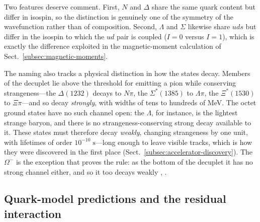 Two features deserve comment. First, $N$ and $\Delta$ share the same quark content but
differ in isospin, so the distinction is genuinely one of the symmetry of the
wavefunction rather than of composition. Second, $\Lambda$ and $\Sigma$ likewise share
$uds$ but differ in the isospin to which the $ud$ pair is coupled ($I=0$ versus $I=1$),
which is exactly the difference exploited in the magnetic-moment calculation of
Sect.~\ref{subsec:magnetic-moments}.

The naming also tracks a physical distinction in how the states decay. Members of the
decuplet lie above the threshold for emitting a pion while conserving strangeness---the
$\Delta(1232)$ decays to $N\pi$, the $\Sigma^{*}(1385)$ to $\Lambda\pi$, the
$\Xi^{*}(1530)$ to $\Xi\pi$---and so decay \emph{strongly}, with widths of tens to
hundreds of MeV. The octet ground states have no such channel open: the $\Lambda$, for
instance, is the lightest strange baryon, and there is no strangeness-conserving strong
decay available to it. These states must therefore decay \emph{weakly}, changing
strangeness by one unit, with lifetimes of order $10^{-10}\;\mathrm{s}$---long enough to
leave visible tracks, which is how they were discovered in the first place
(Sect.~\ref{subsec:accelerator-discovery}). The $\Omega^{-}$ is the exception that proves
the rule: as the bottom of the decuplet it has no strong channel either, and so it too
decays weakly \cite[Ch.~4]{Amsler2018}, \cite[Ch.~13]{Amsler2018}.

\subsection{Quark-model predictions and the residual interaction}
\label{subsec:qm-predictions}

